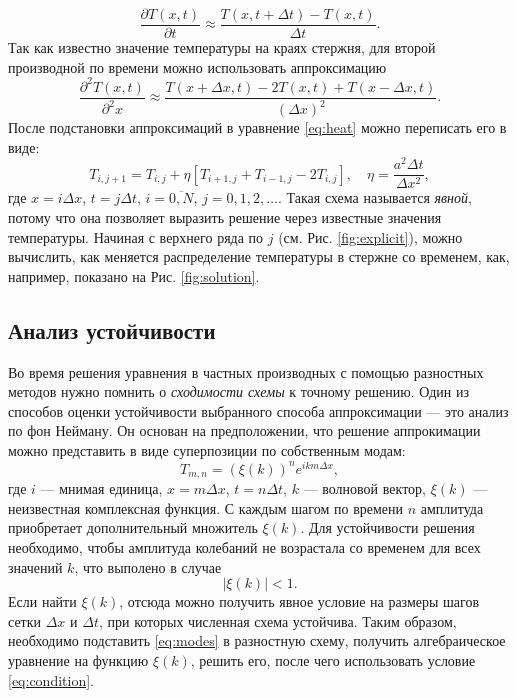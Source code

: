 \documentclass[12pt]{article}
\begin{document}
%
\begin{equation}
\frac{\partial T(x, t)}{\partial t}\approx \frac{T(x,t+\Delta t)-T(x,t)}{\Delta t}.
\end{equation}
%
Так как известно значение температуры на краях стержня, для второй производной по времени можно использовать аппроксимацию
%
\begin{equation}
\frac{\partial^2 T(x, t)}{\partial^2 x}\approx \frac{T(x+\Delta x,t)-2T(x,t)+T(x-\Delta x, t)}{(\Delta x)^2}.
\end{equation}
После подстановки аппроксимаций в уравнение \eqref{eq:heat} можно переписать его в виде:
%
\begin{equation}
T_{i,j+1}=T_{i,j}+\eta\left[T_{i+1,j}+T_{i-1,j}-2T_{i,j}\right], \quad \eta=\frac{a^2 \Delta t}{\Delta x^2},
\end{equation}
%
где $x=i\Delta x$, $t=j\Delta t$, $i=\overline{0,N}$, $j=0,1,2,\ldots$. Такая схема называется \textit{явной}, потому что она позволяет выразить решение через известные значения температуры. Начиная с верхнего ряда по $j$ (см. Рис. \ref{fig:explicit}), можно вычислить, как меняется распределение температуры в стержне со временем, как, например, показано на Рис. \ref{fig:solution}.

\subsection*{Анализ устойчивости}
Во время решения уравнения в частных производных с помощью разностных методов нужно помнить о \textit{сходимости схемы} к точному решению. Один из способов оценки устойчивости выбранного способа аппроксимации --- это анализ по фон Нейману. Он основан на предположении, что решение аппрокимации можно представить в виде суперпозиции по собственным модам:
\begin{equation}
T_{m,n}=(\xi(k))^n e^{ikm\Delta x},
\label{eq:modes}
\end{equation}
где $i$ --- мнимая единица, $x=m\Delta x$, $t=n\Delta t$, $k$ --- волновой вектор, $\xi(k)$ --- неизвестная комплексная функция. С каждым шагом по времени $n$ амплитуда приобретает дополнительный множитель $\xi(k)$. Для устойчивости решения необходимо, чтобы амплитуда колебаний не возрастала со временем для всех значений $k$, что выполено в случае
\begin{equation}
|\xi(k)|<1.
\label{eq:condition}
\end{equation}
Если найти $\xi(k)$, отсюда можно получить явное условие на размеры шагов сетки $\Delta x$ и $\Delta t$, при которых численная схема устойчива. Таким образом, необходимо подставить \eqref{eq:modes} в разностную схему, получить алгебраическое уравнение на функцию $\xi(k)$, решить его, после чего использовать условие \eqref{eq:condition}.
\end{document}
